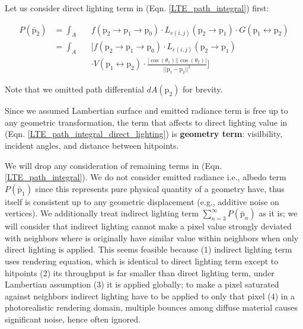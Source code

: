 Let us consider direct lighting term in (Eqn. \ref{LTE_path_integral}) first:

\begin{align}
    \mathit{P}\left(\bar{\mathrm{p}}_2\right) & = \int_A && f\left(\mathrm{p}_2\rightarrow \mathrm{p}_1 \rightarrow \mathrm{p}_0\right)\cdot L_{e(i,j)}\left(\mathrm{p}_2\rightarrow \mathrm{p}_1\right) \cdot G\left(\mathrm{p}_1 \leftrightarrow \mathrm{p}_2\right) \nonumber \\
    & = \int_A && \Bigg[ f\left(\mathrm{p}_2\rightarrow \mathrm{p}_1 \rightarrow \mathrm{p}_0\right)\cdot L_{e(i,j)}(\mathrm{p}_2\rightarrow \mathrm{p}_1) \nonumber \\ 
    & && \cdot V(\mathrm{p}_1 \leftrightarrow \mathrm{p}_2) \cdot \frac{|\cos(\theta_1)| |\cos(\theta_2)|}{||\mathrm{p}_1-\mathrm{p}_2||^2}\Bigg]
    \label{LTE_path_integral_direct_lighting}
\end{align}

Note that we omitted path differential $dA(\mathrm{p}_2)$ for brevity.

Since we assumed Lambertian surface and emitted radiance term is free up to any geometric transformation, the term that affects to direct lighting value in (Eqn. \ref{LTE_path_integral_direct_lighting}) is \textbf{geometry term}: visilbility, incident angles, and distance between hitpoints. 

We will drop any consideration of remaining terms in (Eqn. \ref{LTE_path_integral}). We do not consider emitted radiance i.e., albedo term $\mathit{P}\left(\bar{\mathrm{p}}_1\right)$ since this represents pure physical quantity of a geometry have, thus itself is consistent up to any geometric displacement (e.g., additive noise on vertices).
We additionally treat indirect lighting term $\sum_{n=3}^\infty \mathit{P}(\bar{\mathrm{p}}_n)$ as it is; we will consider that indirect lighting cannot make a pixel value strongly deviated with neighbors where is originally have similar value within neighbors when only direct lighting is applied. 
This seems feasible because (1) indirect lighting term uses rendering equation, which is identical to direct lighting term except to hitpoints (2) its throughput is far smaller than direct lighting term, under Lambertian assumption (3) it is applied globally; to make a pixel saturated against neighbors indirect lighting have to be applied to only that pixel (4) in a photorealistic rendering domain, multiple bounces among diffuse material causes significant noise, hence often ignored\cite{moon2013robust}.

